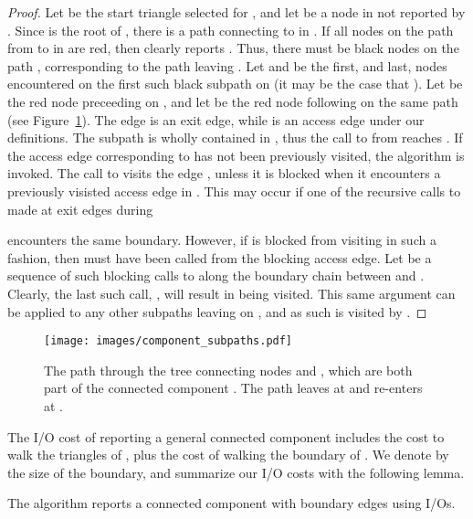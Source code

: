   \begin{proof}
  Let  be the start triangle selected for ,
  and let  be a node in  not reported by 
  .
  Since  is the root of , there is a path connecting  
  to  in  . 
  If all nodes on the path from  to  in  are red, then
  clearly  reports .
  Thus, there must be black nodes on the path , corresponding to
  the path leaving .
  Let  and  be the first, and last, nodes encountered on the first such
  black subpath on  (it may be the case that ).
  Let  be the red node preceeding  on , and let  be
  the red node following  on the same path (see 
  Figure~\ref{fig:component_subpaths}).
  The edge  is an exit edge, while  is an access edge under
  our definitions. 
  The subpath  is wholly contained in , thus the call
  to  from  reaches .
  If the access edge corresponding to  has not 
  been previously visited, the  algorithm is invoked.
  The call to  visits the edge , unless it
  is blocked when it encounters a previously visisted access edge in 
  .
  This may  occur if one of the recursive 
  calls to  made at exit edges during 
   
  encounters the same boundary. 
  However, if  is blocked from visiting  in 
  such a fashion, then  must have been called
  from the blocking access edge. 
  Let  be a sequence of such blocking calls to 
   along the boundary chain between  
  and . 
  Clearly, the last such call, , will result in  being visited. 
  This same argument can be applied to any other subpaths leaving 
   on , and as such  is visited by 
  .
  \end{proof}

  \begin{figure}[th]
	  \centering
		  \texttt{[image: images/component\_subpaths.pdf]}
	  \caption[General component subpaths]{The path through the tree 
	   connecting nodes  and , which are both
	  part of the connected component . The path
	  leaves  at  and re-enters at .}
	  \label{fig:component_subpaths}
  \end{figure}
  
  The I/O cost of reporting a general connected component includes
  the cost to walk the triangles of , plus the cost
  of walking the boundary of .
  We denote by  the size of the boundary, and summarize our I/O
  costs with the following lemma.

  \begin{lemma}\label{lem:io_eff_ccomp}
  The algorithm  reports a connected 
  component 
   with  boundary edges using 
   I/Os.
  \end{lemma} 

